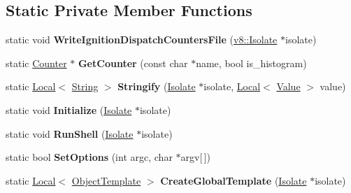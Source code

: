 \subsection*{Static Private Member Functions}
\begin{DoxyCompactItemize}
\item 
static void {\bfseries Write\+Ignition\+Dispatch\+Counters\+File} (\hyperlink{classv8_1_1_isolate}{v8\+::\+Isolate} $\ast$isolate)\hypertarget{classv8_1_1_shell_ab95d667830e69a0b8c4d165d40d38478}{}\label{classv8_1_1_shell_ab95d667830e69a0b8c4d165d40d38478}

\item 
static \hyperlink{classv8_1_1_counter}{Counter} $\ast$ {\bfseries Get\+Counter} (const char $\ast$name, bool is\+\_\+histogram)\hypertarget{classv8_1_1_shell_a9a9a749cfd7970fd97ab86cc1423e6d1}{}\label{classv8_1_1_shell_a9a9a749cfd7970fd97ab86cc1423e6d1}

\item 
static \hyperlink{classv8_1_1_local}{Local}$<$ \hyperlink{classv8_1_1_string}{String} $>$ {\bfseries Stringify} (\hyperlink{classv8_1_1_isolate}{Isolate} $\ast$isolate, \hyperlink{classv8_1_1_local}{Local}$<$ \hyperlink{classv8_1_1_value}{Value} $>$ value)\hypertarget{classv8_1_1_shell_ad311375692ab88b5c862374dad8563ec}{}\label{classv8_1_1_shell_ad311375692ab88b5c862374dad8563ec}

\item 
static void {\bfseries Initialize} (\hyperlink{classv8_1_1_isolate}{Isolate} $\ast$isolate)\hypertarget{classv8_1_1_shell_a8d003294b3204a68f445e9a184cd5aca}{}\label{classv8_1_1_shell_a8d003294b3204a68f445e9a184cd5aca}

\item 
static void {\bfseries Run\+Shell} (\hyperlink{classv8_1_1_isolate}{Isolate} $\ast$isolate)\hypertarget{classv8_1_1_shell_a8efa3d2d7962acc3d7a1301456aa836b}{}\label{classv8_1_1_shell_a8efa3d2d7962acc3d7a1301456aa836b}

\item 
static bool {\bfseries Set\+Options} (int argc, char $\ast$argv\mbox{[}$\,$\mbox{]})\hypertarget{classv8_1_1_shell_aa722cb722ec69d5dcb591053ba705674}{}\label{classv8_1_1_shell_aa722cb722ec69d5dcb591053ba705674}

\item 
static \hyperlink{classv8_1_1_local}{Local}$<$ \hyperlink{classv8_1_1_object_template}{Object\+Template} $>$ {\bfseries Create\+Global\+Template} (\hyperlink{classv8_1_1_isolate}{Isolate} $\ast$isolate)\hypertarget{classv8_1_1_shell_ae940ff9cde3abf34c36a0bee4ed3f490}{}\label{classv8_1_1_shell_ae940ff9cde3abf34c36a0bee4ed3f490}

\end{DoxyCompactItemize}
